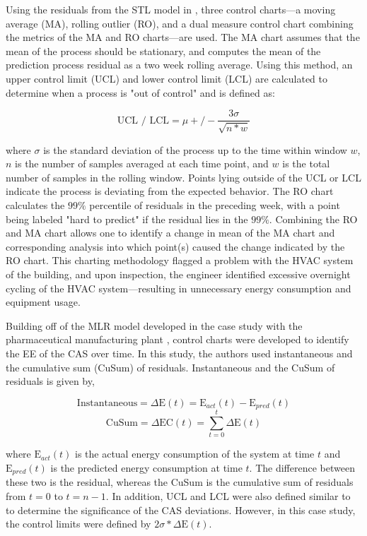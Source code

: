 Using the residuals from the STL model in \cite{tightening}, three control charts—a moving average (MA), rolling outlier (RO), and a dual measure control chart combining the metrics of the MA and RO charts—are used. The MA chart assumes that the mean of the process should be stationary, and computes the mean of the prediction process residual as a two week rolling average. Using this method, an upper control limit (UCL) and lower control limit (LCL) are calculated to determine when a process is "out of control" and is defined as:

$$\text{UCL / LCL} = \mu +/- \frac{3\sigma}{\sqrt{n * w}}$$

where $\sigma$ is the standard deviation of the process up to the time within window $w$, $n$ is the number of samples averaged at each time point, and $w$ is the total number of samples in the rolling window. Points lying outside of the UCL or LCL indicate the process is deviating from the expected behavior. The RO chart calculates the $99\%$ percentile of residuals in the preceding week, with a point being labeled "hard to predict" if the residual lies in the $99\%$. Combining the RO and MA chart allows one to identify a change in mean of the MA chart and corresponding analysis into which point(s) caused the change indicated by the RO chart. This charting methodology flagged a problem with the HVAC system of the building, and upon inspection, the engineer identified excessive overnight cycling of the HVAC system—resulting in unnecessary energy consumption and equipment usage. 

Building off of the MLR model developed in the case study with the pharmaceutical manufacturing plant \cite{cas}, control charts were developed to identify the EE of the CAS over time. In this study, the authors used instantaneous and the cumulative sum (CuSum) of residuals. Instantaneous and the CuSum of residuals is given by,

$$\text{Instantaneous} = \Delta \text{E}(t) = \text{E}_{act}(t) - \text{E}_{pred}(t)$$
$$\text{CuSum} = \Delta \text{EC}(t) = \sum_{t=0}^t\Delta \text{E}(t)$$

where $\text{E}_{act}(t)$ is the actual energy consumption of the system at time $t$ and $\text{E}_{pred}(t)$ is the predicted energy consumption at time $t$. The difference between these two is the residual, whereas the CuSum is the cumulative sum of residuals from $t=0$ to $t=n-1$. In addition, UCL and LCL were also defined similar to \cite{tightening} to determine the significance of the CAS deviations. However, in this case study, the control limits were defined by $2 \sigma * \Delta \text{E}(t)$. 

